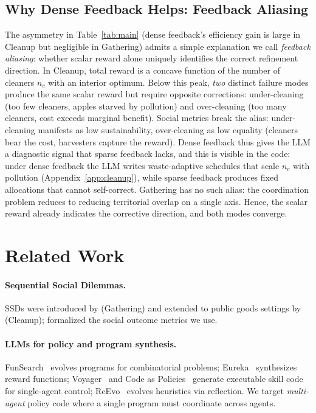 \documentclass{nextgame2026} %
\begin{document}
\subsection{Why Dense Feedback Helps: Feedback Aliasing}
\label{sec:aliasing}

The asymmetry in Table~\ref{tab:main} (dense feedback's efficiency gain is
large in Cleanup but negligible in Gathering) admits a simple explanation
we call \emph{feedback aliasing}: whether scalar reward alone uniquely
identifies the correct refinement direction.
In Cleanup, total reward is a concave function of the number of cleaners
$n_c$ with an interior optimum.  Below this peak, \emph{two} distinct
failure modes produce the same scalar reward but require opposite
corrections: under-cleaning (too few cleaners, apples starved by
pollution) and over-cleaning (too many cleaners, cost exceeds marginal
benefit).  Social metrics break the alias: under-cleaning manifests as
low sustainability, over-cleaning as low equality (cleaners bear the cost,
harvesters capture the reward).  Dense feedback thus gives the LLM a
diagnostic signal that sparse feedback lacks, and this is visible in the
code: under dense feedback the LLM writes waste-adaptive schedules that
scale $n_c$ with pollution (Appendix~\ref{app:cleanup}), while sparse
feedback produces fixed allocations that cannot self-correct.
Gathering has no such alias: the coordination problem reduces to
reducing territorial overlap on a single axis. Hence, the scalar reward already indicates the corrective direction, and both modes converge.


\section{Related Work}
\label{sec:related}

\paragraph{Sequential Social Dilemmas.}
SSDs were introduced by \citet{leibo2017multi} (Gathering) and extended
to public goods settings by \citet{hughes2018inequity} (Cleanup);
\citet{perolat2017multi} formalized the social outcome metrics we use.

\paragraph{LLMs for policy and program synthesis.}
FunSearch~\citep{romera2024mathematical} evolves programs for
combinatorial problems; Eureka~\citep{ma2024eureka} synthesizes reward
functions; Voyager~\citep{wang2024voyager} and Code as
Policies~\citep{code-as-policies} generate executable skill code for
single-agent control; ReEvo~\citep{ye2024reevo} evolves heuristics via
reflection.  We target \emph{multi-agent} policy code where a single
program must coordinate across agents.
\end{document}
